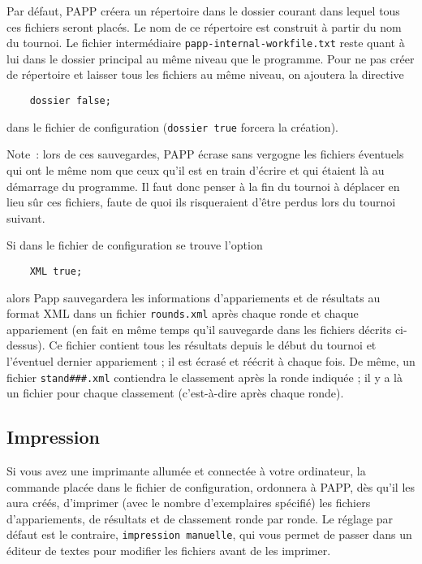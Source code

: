 \documentclass[10pt]{article}
\begin{document}
Par d\'efaut, PAPP cr\'eera un r\'epertoire dans le dossier courant dans lequel tous ces fichiers seront plac\'es.
Le nom de ce r\'epertoire est construit \`a partir du nom du tournoi. Le fichier interm\'ediaire \verb|papp-internal-workfile.txt| reste quant \`a lui dans le dossier principal au m\^eme niveau que le programme.
Pour ne pas cr\'eer de r\'epertoire et laisser tous les fichiers au m\^eme niveau, on ajoutera la directive
\begin{verbatim}
    dossier false;
\end{verbatim}
dans le fichier de configuration (\verb|dossier true| forcera la cr\'eation).
 
Note~: lors de ces sauvegardes, PAPP \'ecrase sans vergogne les 
fichiers \'eventuels qui ont le m\^eme nom que ceux qu'il est en train 
d'\'ecrire et qui \'etaient l\`a au d\'emarrage du programme.  Il faut 
donc penser \`a la fin du tournoi \`a d\'eplacer en lieu s\^ur ces 
fichiers, faute de quoi ils risqueraient d'\^etre perdus lors du 
tournoi suivant.

Si dans le fichier de configuration se trouve l'option
\begin{verbatim}
    XML true;
\end{verbatim}
alors Papp sauvegardera les informations d'appariements et de r\'esultats au format XML dans un fichier \verb|rounds.xml| apr\`es chaque ronde et chaque appariement (en fait en m\^eme temps qu'il sauvegarde dans les fichiers d\'ecrits ci-dessus). Ce fichier contient tous les r\'esultats depuis le d\'ebut du tournoi et l'\'eventuel dernier appariement ; il est \'ecras\'e et r\'e\'ecrit \`a chaque fois. De m\^eme, un fichier \verb|stand###.xml| contiendra le classement apr\`es la ronde indiqu\'ee ; il y a l\`a  un fichier pour chaque classement (c'est-\`a-dire apr\`es chaque ronde).

\subsection{Impression}

Si vous avez une imprimante allum\'ee et connect\'ee \`a votre ordinateur, la 
commande 
\medbreak
{}
\medbreak
\noindent plac\'ee dans le fichier de configuration, ordonnera \`a PAPP, d\`es 
qu'il les aura cr\'e\'es, d'imprimer (avec le nombre d'exemplaires 
sp\'ecifi\'e) les fichiers d'appariements, de r\'esultats et de 
classement ronde par ronde.  Le r\'eglage par d\'efaut est le 
contraire, \verb|impression manuelle|, qui vous permet de passer dans 
un \'editeur de textes pour modifier les fichiers avant de les 
imprimer.
\end{document}
